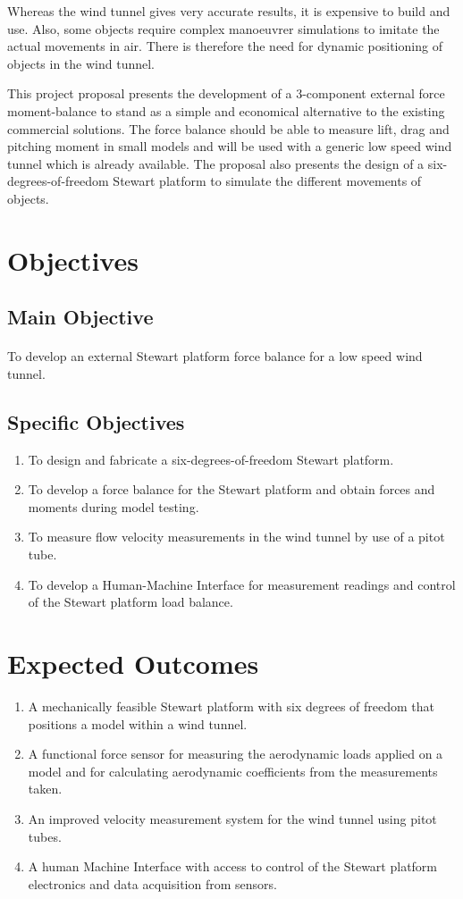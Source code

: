 Whereas the wind tunnel gives very accurate results, it is expensive to build and use. Also, some objects require complex manoeuvrer simulations to imitate the actual movements in air. There is therefore the need for dynamic positioning of objects in the wind tunnel.

This project proposal presents the development of a 3-component external force moment-balance to stand as a simple and economical alternative to the existing commercial solutions. The force balance should be able to measure lift, drag and pitching moment in small models and will be used with a generic low speed wind tunnel which is already available. The proposal also presents the design of a six-degrees-of-freedom Stewart platform to simulate the different movements of objects.
\section{Objectives}
\subsection{Main Objective}
\paragraph{} To develop an external Stewart platform force balance for a low speed wind tunnel. 
\subsection{Specific Objectives}
\begin{enumerate}
\item To design and fabricate a six-degrees-of-freedom Stewart platform.
\item To develop a force balance for the Stewart platform and obtain forces and moments during model testing.
\item To measure flow velocity measurements in the wind tunnel by use of a pitot tube.
\item To develop a Human-Machine Interface for measurement readings and control of the Stewart platform load balance.
\end{enumerate}
\section{Expected Outcomes}
\begin{enumerate}
\item A mechanically feasible Stewart platform with six degrees of freedom that positions a model
within a wind tunnel.
\item A functional force sensor for measuring the aerodynamic loads applied on a model
and for calculating aerodynamic coefficients from the measurements taken.
\item An improved velocity measurement system for the wind tunnel using pitot tubes.
\item A human Machine Interface with access to control of the Stewart platform electronics
and data acquisition from sensors.
\end{enumerate}
